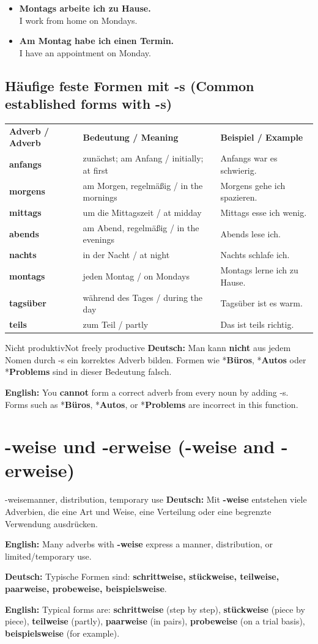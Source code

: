 \documentclass[a4paper,11pt]{article}
\newcommand{\GermanText}[1]{\textbf{Deutsch: }#1\par}
\newcommand{\EnglishText}[1]{{\small\color{SoftGray}\textbf{English: }#1\par}}
\newcommand{\ExampleItem}[2]{\item \textbf{#1}\\{\small\color{SoftGray}#2}}
\newcommand{\BSection}[2]{\section{#1 \textnormal{\small (#2)}}}
\newcommand{\BSubsection}[2]{\subsection{#1 \textnormal{\small (#2)}}}
\begin{document}
\begin{exbox}
\begin{itemize}
\ExampleItem{Montags arbeite ich zu Hause.}{I work from home on Mondays.}
\ExampleItem{Am Montag habe ich einen Termin.}{I have an appointment on Monday.}
\end{itemize}
\end{exbox}

\BSubsection{Häufige feste Formen mit -s}{Common established forms with -s}

\begin{longtable}{>{\bfseries}p{3.2cm}|p{5.0cm}|p{5.8cm}}
\rowcolor{HeaderBlueDark}
\color{white}\textbf{Adverb / Adverb} & \color{white}\textbf{Bedeutung / Meaning} & \color{white}\textbf{Beispiel / Example} \\
anfangs & zunächst; am Anfang / initially; at first & Anfangs war es schwierig. \\
morgens & am Morgen, regelmäßig / in the mornings & Morgens gehe ich spazieren. \\
mittags & um die Mittagszeit / at midday & Mittags esse ich wenig. \\
abends & am Abend, regelmäßig / in the evenings & Abends lese ich. \\
nachts & in der Nacht / at night & Nachts schlafe ich. \\
montags & jeden Montag / on Mondays & Montags lerne ich zu Hause. \\
tagsüber & während des Tages / during the day & Tagsüber ist es warm. \\
teils & zum Teil / partly & Das ist teils richtig. \\
\end{longtable}

\begin{grammarentry}{Nicht produktiv}{Not freely productive}
\GermanText{Man kann \textbf{nicht} aus jedem Nomen durch -s ein korrektes Adverb bilden. Formen wie *\textbf{Büros}, *\textbf{Autos} oder *\textbf{Problems} sind in dieser Bedeutung falsch.}
\EnglishText{You \textbf{cannot} form a correct adverb from every noun by adding -s. Forms such as *\textbf{Büros}, *\textbf{Autos}, or *\textbf{Problems} are incorrect in this function.}
\end{grammarentry}

\BSection{-weise und -erweise}{-weise and -erweise}

\begin{grammarentry}{-weise}{manner, distribution, temporary use}
\GermanText{Mit \textbf{-weise} entstehen viele Adverbien, die eine Art und Weise, eine Verteilung oder eine begrenzte Verwendung ausdrücken.}
\EnglishText{Many adverbs with \textbf{-weise} express a manner, distribution, or limited/temporary use.}

\GermanText{Typische Formen sind: \textbf{schrittweise, stückweise, teilweise, paarweise, probeweise, beispielsweise}.}
\EnglishText{Typical forms are: \textbf{schrittweise} (step by step), \textbf{stückweise} (piece by piece), \textbf{teilweise} (partly), \textbf{paarweise} (in pairs), \textbf{probeweise} (on a trial basis), \textbf{beispielsweise} (for example).}
\end{grammarentry}
\end{document}
